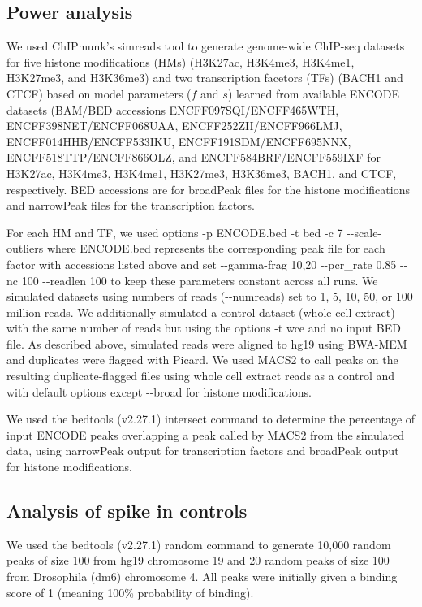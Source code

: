 \documentclass[12pt]{article}
\begin{document}

\subsection*{Power analysis}
We used ChIPmunk's simreads tool to generate genome-wide ChIP-seq datasets for five histone modifications (HMs) (H3K27ac, H3K4me3, H3K4me1, H3K27me3, and H3K36me3) and two transcription facetors (TFs) (BACH1 and CTCF) based on model parameters ($f$ and $s$) learned from available ENCODE datasets (BAM/BED accessions ENCFF097SQI/ENCFF465WTH, ENCFF398NET/ENCFF068UAA, ENCFF252ZII/ENCFF966LMJ, ENCFF014HHB/ENCFF533IKU, ENCFF191SDM/ENCFF695NNX, ENCFF518TTP/ENCFF866OLZ, and ENCFF584BRF/ENCFF559IXF for H3K27ac, H3K4me3, H3K4me1, H3K27me3, H3K36me3, BACH1, and CTCF, respectively. BED accessions are for broadPeak files for the histone modifications and narrowPeak files for the transcription factors.

For each HM and TF, we used options -p ENCODE.bed -t bed -c 7 -{}-scale-outliers where ENCODE.bed represents the corresponding peak file for each factor with accessions listed above and set -{}-gamma-frag 10,20 -{}-pcr\_rate 0.85 -{}-nc 100 -{}-readlen 100 to keep these parameters constant across all runs.
We simulated datasets using numbers of reads (-{}-numreads) set to 1, 5, 10, 50, or 100 million reads.
We additionally simulated a control dataset (whole cell extract) with the same number of reads but using the options -t wce and no input BED file. As described above, simulated reads were aligned to hg19 using BWA-MEM and duplicates were flagged with Picard.
We used MACS2 \cite{MACS2} to call peaks on the resulting duplicate-flagged files using whole cell extract reads as a control and with default options except -{}-broad for histone modifications.

We used the bedtools \cite{bedtools} (v2.27.1) intersect command to determine the percentage of input ENCODE peaks overlapping a peak called by MACS2 from the simulated data, using narrowPeak output for transcription factors and broadPeak output for histone modifications.

\subsection*{Analysis of spike in controls}
We used the bedtools \cite{bedtools} (v2.27.1) random command to generate 10,000 random peaks of size 100 from hg19 chromosome 19 and 20 random peaks of size 100 from Drosophila (dm6) chromosome 4. All peaks were initially given a binding score of 1 (meaning 100\% probability of binding).
\end{document}
